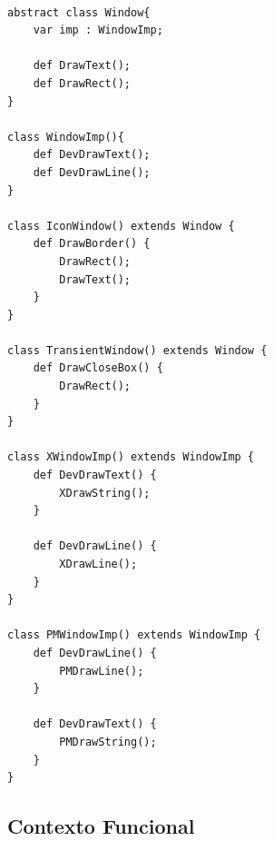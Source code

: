 \begin{lstlisting}[caption={Bridge Orientado a Objetos},label=oobridge]

abstract class Window{
	var imp : WindowImp;

	def DrawText();
	def DrawRect();
}

class WindowImp(){
	def DevDrawText();
	def DevDrawLine();
}

class IconWindow() extends Window {
	def DrawBorder() {
		DrawRect();
		DrawText();
	}
}

class TransientWindow() extends Window {
	def DrawCloseBox() {
		DrawRect();
	}
}

class XWindowImp() extends WindowImp {
	def DevDrawText() {
		XDrawString();
	}

	def DevDrawLine() {
		XDrawLine();
	}
}

class PMWindowImp() extends WindowImp {
	def DevDrawLine() {
		PMDrawLine();
	}

	def DevDrawText() {
		PMDrawString();
	}
}

\end{lstlisting}


\subsection*{Contexto Funcional}

\begin{lstlisting}[caption={Bridge Funcional},label=fpbridge]
    

    
\end{lstlisting}